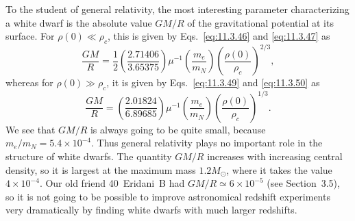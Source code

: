 To the student of general relativity, the most interesting parameter
characterizing a white dwarf is the absolute value \(GM/R\) of the
gravitational potential at its surface. For \(\rho(0)\ll\rho_c\), this is
given by Eqs.~\eqref{eq:11.3.46} and \eqref{eq:11.3.47} as
\begin{equation}
  \frac{GM}{R}
  =
  \frac12\left(\frac{2.71406}{3.65375}\right)
  \mu^{-1}\left(\frac{m_e}{m_N}\right)
  \left(\frac{\rho(0)}{\rho_c}\right)^{2/3},
  \tag{11.3.51}\label{eq:11.3.51}
\end{equation}
whereas for \(\rho(0)\gg\rho_c\), it is given by
Eqs.~\eqref{eq:11.3.49} and \eqref{eq:11.3.50} as
\begin{equation}
  \frac{GM}{R}
  =
  \left(\frac{2.01824}{6.89685}\right)
  \mu^{-1}\left(\frac{m_e}{m_N}\right)
  \left(\frac{\rho(0)}{\rho_c}\right)^{1/3}.
  \tag{11.3.52}\label{eq:11.3.52}
\end{equation}
We see that \(GM/R\) is always going to be quite small, because
\(m_e/m_N=5.4\times10^{-4}\). Thus general relativity plays no important role
in the structure of white dwarfs. The quantity \(GM/R\) increases with
increasing central density, so it is largest at the maximum mass
\(1.2M_\odot\), where it takes the value \(4\times10^{-4}\). Our old friend
40~Eridani~B had \(GM/R\simeq6\times10^{-5}\) (see Section~3.5), so it is
not going to be possible to improve astronomical redshift experiments very
dramatically by finding white dwarfs with much larger redshifts.
